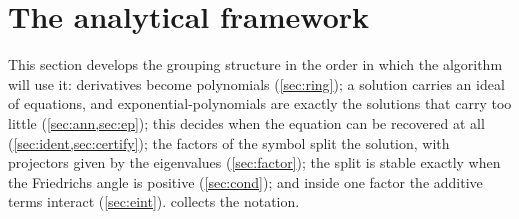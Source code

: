 \documentclass[11pt]{article}
\theoremstyle{plain}
\theoremstyle{definition}
\theoremstyle{remark}
\begin{document}




\section{The analytical framework}\label{sec:analysis}
This section develops the grouping structure in the order in which the algorithm will use it: derivatives become
polynomials (\cref{sec:ring}); a solution carries an ideal of equations, and exponential-polynomials are exactly the
solutions that carry too little (\cref{sec:ann,sec:ep}); this decides when the equation can be recovered at all
(\cref{sec:ident,sec:certify}); the factors of the symbol split the solution, with projectors given by the eigenvalues
(\cref{sec:factor}); the split is stable exactly when the Friedrichs angle is positive (\cref{sec:cond}); and inside one
factor the additive terms interact (\cref{sec:eint}).  collects the notation.
\end{document}
